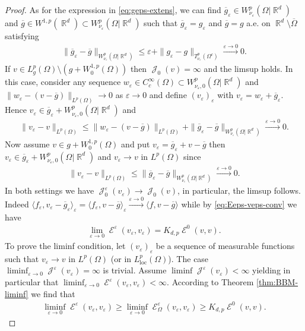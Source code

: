 \documentclass[12pt, reqno]{amsart}%
\theoremstyle{plain}  %
\theoremstyle{definition}  %
\numberwithin{equation}{section}
\DeclareMathOperator{\loc}{loc}
\DeclareMathOperator{\cE}{\mathcal{E}}
\DeclareMathOperator{\cJ}{\mathcal{J}}
\DeclareMathOperator{\R}{\mathbb{R}}
\newcommand{\eps}{\varepsilon}
\newcommand{\WnuOmRa}{W^p_{\nu_\eps}(\Omega|\R^d )}
\newcommand{\WnuOmRao}{W^p_{\nu_\eps,0}(\Omega|\R^d)}
\newcommand{\TnuOma}{T^p_{\nu_\eps} (\Omega^c)}
\begin{document}
\begin{proof}
As for the expression in \eqref{eq:geps-extens}, we can find   $ \overline{g}_\eps\in\WnuOmRa$  and $\overline{g}\in W^{1,p}(\R^d)\subset\WnuOmRa$  such that $\overline{g}_\eps= g_\eps$ and  $\overline{g}= g$ a.e. on $\R^d\setminus\overline{\Omega}$  satisfying
\begin{align*}
\|\overline{g}_\eps-\overline{g}\|_{\WnuOmRa}\leq \eps+ \|g_\eps-g\|_{\TnuOma}\xrightarrow{\eps\to0}0.
\end{align*}
If  $v\in L^p_g(\Omega)\setminus (g+W^{1,p}_0(\Omega))$ then $\cJ_0(v)=\infty$ and the limsup holds.  In this case, consider any sequence $ w_\eps \in C_c^\infty(\Omega)\subset \WnuOmRao$ and  $\|w_\eps-(v-\overline{g})\|_{L^p(\Omega)}\to 0$ as $\eps\to 0$ and define $(v_\eps)_\eps$  with $v_\eps= w_\eps+ \overline{g}_\eps$. Hence $v_\eps\in \overline{g}_\eps +\WnuOmRao$ and
\begin{align*}
\|v_\eps-v\|_{L^p(\Omega)}\leq  \|w_\eps-(v-\overline{g})\|_{L^p(\Omega)}+  \|\overline{g}_\eps-\overline{g}\|_{\WnuOmRa}
\xrightarrow{\eps\to0}0.
\end{align*}
Now assume $v\in g+ W^{1,p}_0(\Omega)$ and put $v_\eps=\overline{g}_\eps+v -\overline{g} $
then $v_\eps\in \overline{g}_\eps+ \WnuOmRao$ and  $v_\eps\to v$ in $L^p(\Omega)$ since
\begin{align*}
\|v_\eps-v\|_{L^p(\Omega)}
\leq \|\overline{g}_\eps-\overline{g}\|_{\WnuOmRa}
\xrightarrow{\eps\to0}0.
\end{align*}
In both settings we have  $\cJ^\eps_0 (v_\eps)\to \cJ_0 (v)$, in particular, the limsup follows. Indeed $\langle f_\eps, v_\eps -\overline{g}_\eps\rangle_\eps
= \langle f_\eps, v -\overline{g}\rangle_\eps\xrightarrow{\eps\to0} \langle f, v-\overline{g}\rangle$ while by \eqref{eq:Eeps-veps-conv} we have
\begin{align*}
\lim_{\eps\to0}\cE^\eps (v_\eps,v_\eps)= K_{d,p}\cE^0 (v,v).
\end{align*}
To prove the liminf condition,  let  $(v_\eps)_\eps$ be a sequence of measurable functions such that $v_\eps\to v$ in $L^p(\Omega)$ (or in $L^p_{\loc}(\Omega)$). The case $\liminf_{\eps\to0}\cJ^\eps(v_\eps)= \infty$ is trivial. Assume $\liminf\cJ^\eps(v_\eps)<\infty$ yielding in particular that  $\liminf_{\eps\to0}\cE^\eps(v_\eps,v_\eps)<\infty$. According to Theorem \ref{thm:BBM-liminf} we find that
\begin{align*}
\liminf_{\eps\to0}\cE^\eps(v_\eps,v_\eps)\geq
\liminf_{\eps\to0}\cE^\eps_\Omega(v_\eps,v_\eps)\geq K_{d,p}\cE^0(v,v).

\end{align*}
\end{proof}
\end{document}

